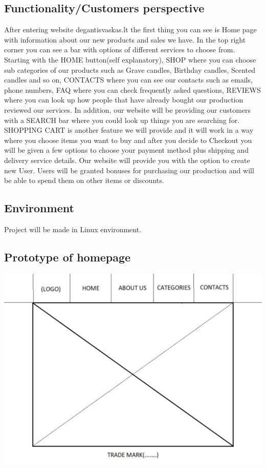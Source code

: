 \documentclass[a4paper,12pt,fleqn]{article}
\begin{document}
\subsection{Functionality/Customers perspective}
\label{sec:example}
After entering website degantisvaskas.lt the first thing you can see is Home page with information about our new products and sales we have. In the top right corner you can see a bar with options of different services to choose from. Starting with the HOME button(self explanatory), SHOP where you can choose sub categories of our products such as Grave candles, Birthday candles, Scented candles and so on, CONTACTS where you can see our contacts such as emails, phone numbers, FAQ where you can check frequently asked questions, REVIEWS where you can look up how people that have already bought our production reviewed our services. In addition, our website will be providing our customers with a SEARCH bar where you could look up things you are searching for. SHOPPING CART is another feature we will provide and it will work in a way where you choose items you want to buy and after you decide to Checkout you will be given a few options to choose your payment method plus shipping and delivery service details. Our website will provide you with the option to create new User. Users will be granted bonuses for purchasing our production and will be able to spend them on other items or discounts.
\subsection{Environment}
\label{sec:example}
Project will be made in Linux environment.
\subsection{Prototype of homepage}
\label{sec:example}
\includegraphics[width=15cm]{pic}
\end{document}
